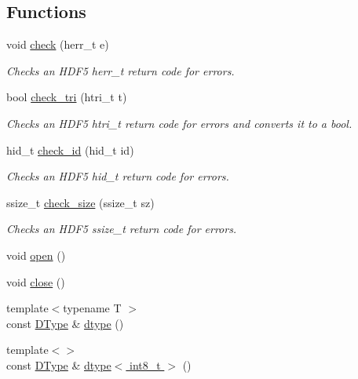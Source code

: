 \subsection*{Functions}
\begin{DoxyCompactItemize}
\item 
void \hyperlink{namespace_h5_t_l_ab1eb736c80826c4999a4644ff4d1b918}{check} (herr\-\_\-t e)
\begin{DoxyCompactList}\small\item\em Checks an H\-D\-F5 herr\-\_\-t return code for errors. \end{DoxyCompactList}\item 
bool \hyperlink{namespace_h5_t_l_ab61feeb286c0d3e6c82b22277ac9291b}{check\-\_\-tri} (htri\-\_\-t t)
\begin{DoxyCompactList}\small\item\em Checks an H\-D\-F5 htri\-\_\-t return code for errors and converts it to a bool. \end{DoxyCompactList}\item 
hid\-\_\-t \hyperlink{namespace_h5_t_l_add11f817badecc20cdffaeca031e7ab5}{check\-\_\-id} (hid\-\_\-t id)
\begin{DoxyCompactList}\small\item\em Checks an H\-D\-F5 hid\-\_\-t return code for errors. \end{DoxyCompactList}\item 
ssize\-\_\-t \hyperlink{namespace_h5_t_l_ab5f7e50bf1e42f78c4fc0214b6cceb57}{check\-\_\-size} (ssize\-\_\-t sz)
\begin{DoxyCompactList}\small\item\em Checks an H\-D\-F5 ssize\-\_\-t return code for errors. \end{DoxyCompactList}\item 
void \hyperlink{namespace_h5_t_l_a31797435e6c9f7813cc320fc4529192f}{open} ()
\item 
void \hyperlink{namespace_h5_t_l_a1068acc4b97b59901883bbb88b1f4434}{close} ()
\item 
{\footnotesize template$<$typename T $>$ }\\const \hyperlink{class_h5_t_l_1_1_d_type}{D\-Type} \& \hyperlink{namespace_h5_t_l_aa0de5dcbc2c4c8a99ed8e35774ba15ab}{dtype} ()
\item 
{\footnotesize template$<$$>$ }\\const \hyperlink{class_h5_t_l_1_1_d_type}{D\-Type} \& \hyperlink{namespace_h5_t_l_a889fa5a542d1ee8e363d2686f1e447d7}{dtype$<$ int8\-\_\-t $>$} ()
\item 

\end{DoxyCompactItemize}
